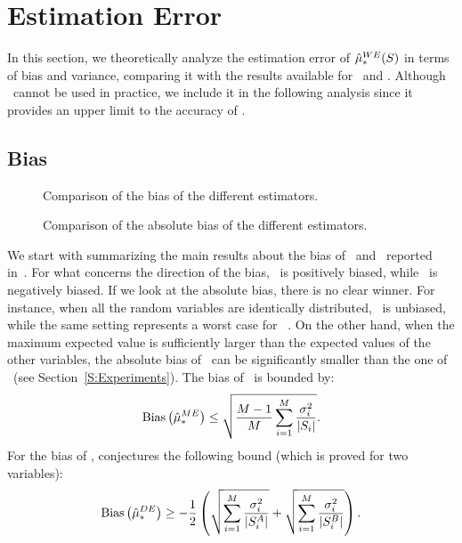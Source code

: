 \section{Estimation Error}\label{S:Analysis}

In this section, we theoretically analyze the estimation error of $\hat\mu_*^{WE}(S)$ in terms of bias and variance, comparing it with the results available for \ME~and \CV.
Although \OWE~cannot be used in practice, we include it in the following analysis since it provides an upper limit to the accuracy of \WE.

\subsection{Bias}

\begin{figure*}[t]
    \begin{minipage}{0.45\textwidth}
    \centering 
    \setlength\figureheight{4cm}
    \setlength\figurewidth{6cm}
     
    \caption{Comparison of the bias of the different estimators.}\label{F:bias}
    \end{minipage}
    \hfill
    \begin{minipage}{0.54\textwidth}    
    \centering 
    \setlength\figureheight{4cm}
    \setlength\figurewidth{6cm}
     
    \caption{Comparison of the absolute bias of the different estimators.}\label{F:absolute_bias}
    \end{minipage}
\end{figure*}

We start with summarizing the main results about the bias of \ME~and \CV~reported in~\cite{van2013estimating}.
For what concerns the direction of the bias, \ME~is positively biased, while \CV~is negatively biased.
If we look at the absolute bias, there is no clear winner. 
For instance, when all the random variables are identically distributed, \CV~is unbiased, while the same setting represents a worst case for \ME~.
On the other hand, when the maximum expected value is sufficiently larger than the expected values of the other variables, the absolute bias of \ME~can be significantly smaller than the one of \CV~(see Section~\ref{S:Experiments}).
The bias of \ME~is bounded by:
$$\mathrm{Bias}\left(\hat\mu_*^{ME}\right) \leq \sqrt{\frac{M-1}{M}\sum_{i=1}^M \frac{\sigma_i^2}{|S_i|}}.$$
For the bias of \CV, \citet{van2013estimating} conjectures the following bound (which is proved for two variables):
$$\mathrm{Bias}\left(\hat\mu_*^{DE}\right) \geq -\frac{1}{2}\left(\sqrt{\sum_{i=1}^M \frac{\sigma_i^2}{|S^A_i|}} + \sqrt{\sum_{i=1}^M \frac{\sigma_i^2}{|S^B_i|}}\right). $$

